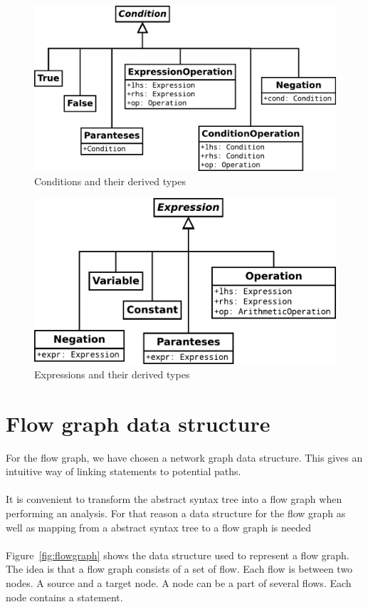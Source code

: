 \begin{figure}[h]
	\centering
	\includegraphics[scale=.5]{../fig/Condition}
	\caption{Conditions and their derived types}
	\label{fig:condition}
\end{figure}

\begin{figure}[h]
	\centering
	\includegraphics[scale=.5]{../fig/Expression}
	\caption{Expressions and their derived types}
	\label{fig:expression}
\end{figure}

\section{Flow graph data structure}
\label{sec:constructing_flow_graphs}
For the flow graph, we have chosen a network graph data structure. This gives an intuitive way of linking statements to potential paths.
\\
\\
It is convenient to transform the abstract syntax tree into a flow graph when performing an analysis. For that reason a data structure for the flow graph as well as mapping from a abstract syntax tree to a flow graph is needed 
\\
\\
Figure~\ref{fig:flowgraph} shows the data structure used to represent a flow graph. The idea is that a flow graph consists of a set of flow. Each flow is between two nodes. A source and a target node. A node can be a part of several flows. Each node contains a statement.	

